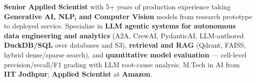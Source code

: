 \documentclass[letter,10pt]{article}
\begin{document}

\textbf{Senior Applied Scientist} with 5+ years of production experience taking \textbf{Generative AI, NLP, and Computer Vision} models from research prototype to deployed service.
Specialize in \textbf{LLM agentic systems for autonomous data engineering and analytics} (A2A, CrewAI, PydanticAI, LLM-authored \textbf{DuckDB/SQL} over databases and S3), \textbf{retrieval and RAG} (Qdrant, FAISS, hybrid dense/sparse search), and \textbf{quantitative model evaluation} --- cell-level precision/recall/F1 grading with LLM root-cause analysis.
M.Tech in AI from \textbf{IIT Jodhpur}; \textbf{Applied Scientist} at \textbf{Amazon}.
\end{document}

